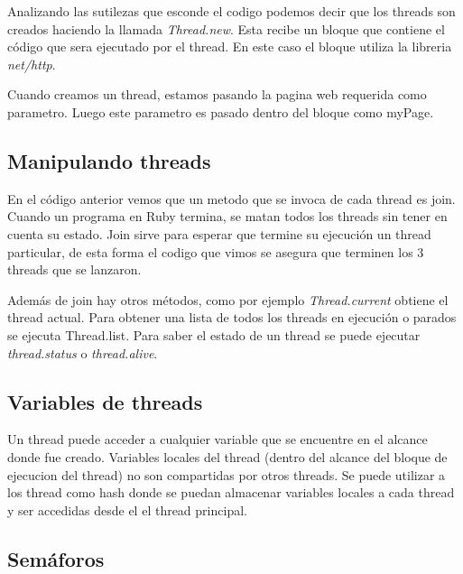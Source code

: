\documentclass{article}
\begin{document}
 
\bigskip

	Analizando las sutilezas que esconde el codigo podemos decir que los threads son creados haciendo la llamada \textit{Thread.new}. Esta recibe un bloque que contiene el código que sera ejecutado por el thread. En este caso el bloque utiliza la libreria \textit{net/http}.
	\par
	Cuando creamos un thread, estamos pasando la pagina web requerida como parametro. Luego este parametro es pasado dentro del bloque como myPage.


\subsection{Manipulando threads}

	En el código anterior vemos que un metodo que se invoca de cada thread es join. Cuando un programa en Ruby termina, se matan todos los threads sin tener en cuenta su estado. Join sirve para esperar que termine su ejecución un thread particular, de esta forma el codigo que vimos se asegura que terminen los 3 threads que se lanzaron.
	\par
	Además de join hay otros métodos, como por ejemplo \textit{Thread.current} obtiene el thread actual. Para obtener una lista de todos los threads en ejecución o parados se ejecuta Thread.list. Para saber el estado de un thread se puede ejecutar \textit{thread.status} o \textit{thread.alive}.


\subsection{Variables de threads}
Un thread puede acceder a cualquier variable que se encuentre en el alcance donde fue creado. Variables locales del thread (dentro del alcance del bloque de ejecucion del thread) no son compartidas por otros threads. Se puede utilizar a los thread como hash donde se puedan almacenar variables locales a cada thread y ser accedidas desde el el thread principal.

 
\bigskip


\subsection{Semáforos}
\end{document}
